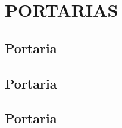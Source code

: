 \documentclass{paper}
\begin{document}
\clearpage\section{PORTARIAS}
\label{anexoPortaria}

\subsection{Portaria \PORTARIACOMISSAO}
\label{anexoPortariaComissao}
\if{}
	
\else
	
\fi

\subsection{Portaria \PORTARIACOMISSAOALT}
\label{anexoPortariaComissaoAlt}
\if{}
	
\else
	
\fi


\subsection{Portaria \PORTARIARECONHECIMENTO}
\label{anexoPortariaReconhecimento}
\if{}

\else

\fi

%	
%	

%	
%	


%
%
%
%
%
\end{document}
